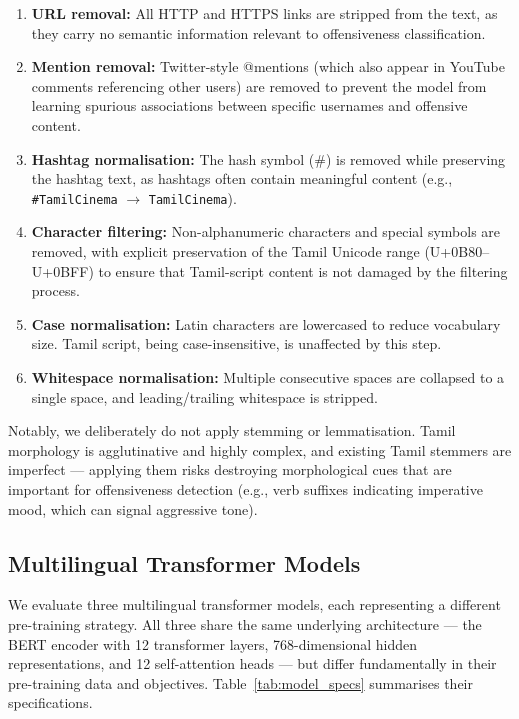\documentclass[12pt, a4paper]{article}
\begin{document}
\begin{enumerate}[leftmargin=2em]
    \item \textbf{URL removal:} All HTTP and HTTPS links are stripped from the text, as they carry no semantic information relevant to offensiveness classification.
    
    \item \textbf{Mention removal:} Twitter-style @mentions (which also appear in YouTube comments referencing other users) are removed to prevent the model from learning spurious associations between specific usernames and offensive content.
    
    \item \textbf{Hashtag normalisation:} The hash symbol (\#) is removed while preserving the hashtag text, as hashtags often contain meaningful content (e.g., \texttt{\#TamilCinema} $\rightarrow$ \texttt{TamilCinema}).
    
    \item \textbf{Character filtering:} Non-alphanumeric characters and special symbols are removed, with explicit preservation of the Tamil Unicode range (U+0B80--U+0BFF) to ensure that Tamil-script content is not damaged by the filtering process.
    
    \item \textbf{Case normalisation:} Latin characters are lowercased to reduce vocabulary size. Tamil script, being case-insensitive, is unaffected by this step.
    
    \item \textbf{Whitespace normalisation:} Multiple consecutive spaces are collapsed to a single space, and leading/trailing whitespace is stripped.
\end{enumerate}

Notably, we deliberately do not apply stemming or lemmatisation. Tamil morphology is agglutinative and highly complex, and existing Tamil stemmers are imperfect --- applying them risks destroying morphological cues that are important for offensiveness detection (e.g., verb suffixes indicating imperative mood, which can signal aggressive tone).

\subsection{Multilingual Transformer Models}

We evaluate three multilingual transformer models, each representing a different pre-training strategy. All three share the same underlying architecture --- the BERT encoder with 12 transformer layers, 768-dimensional hidden representations, and 12 self-attention heads --- but differ fundamentally in their pre-training data and objectives. Table~\ref{tab:model_specs} summarises their specifications.
\end{document}
